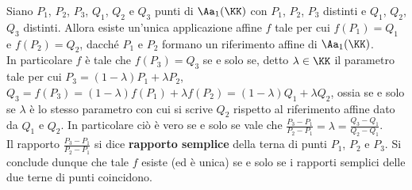 \documentclass[11pt]{article}
\begin{document}
	\begin{remark}  Siano $P_1$, $P_2$, $P_3$, $Q_1$, $Q_2$ e $Q_3$ punti di $\Aa_1(\KK)$ con
		$P_1$, $P_2$, $P_3$ distinti e $Q_1$, $Q_2$, $Q_3$ distinti. Allora esiste un'unica applicazione affine $f$
		tale per cui $f(P_1) = Q_1$ e $f(P_2) = Q_2$, dacché $P_1$ e $P_2$ formano un riferimento affine di $\Aa_1(\KK)$. \\
		
		In particolare $f$ è tale che $f(P_3) = Q_3$ se e solo se, detto $\lambda \in \KK$ il parametro tale per
		cui $P_3 = (1-\lambda) P_1 + \lambda P_2$, $Q_3 = f(P_3) = (1-\lambda) f(P_1) + \lambda f(P_2) =
		(1-\lambda) Q_1 + \lambda Q_2$, ossia se e solo se $\lambda$ è lo stesso parametro con cui si scrive $Q_2$ rispetto
		al riferimento affine dato da $Q_1$ e $Q_2$. In particolare ciò è vero se e solo se vale che $\frac{P_3 - P_1}{P_2 - P_1} = \lambda = \frac{Q_3 - Q_1}{Q_2 - Q_1}$. \\
		
		Il rapporto $\frac{P_3 - P_1}{P_2 - P_1}$ si dice \textbf{rapporto semplice} della terna di punti $P_1$, $P_2$ e $P_3$.
		Si conclude dunque che tale $f$ esiste (ed è unica) se e solo se i rapporti semplici delle due terne di punti
		coincidono.
	\end{remark}
\end{document}
